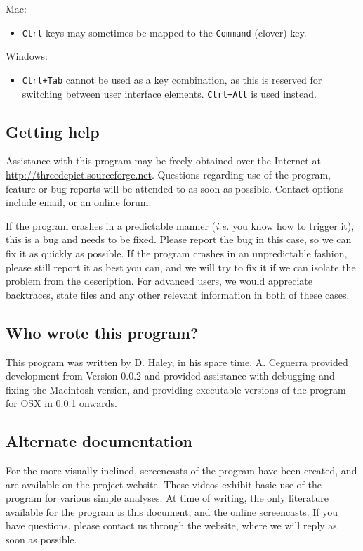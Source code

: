 \documentclass[10pt]{article}
\begin{document}
Mac:
\begin{itemize}
 \item \texttt{Ctrl} keys may sometimes be mapped to the \texttt{Command} (clover) key.
\end{itemize}

Windows:
\begin{itemize}
 \item \texttt{Ctrl+Tab} cannot be used as a key combination, as this is reserved for switching between user interface elements. \texttt{Ctrl+Alt} is used instead.
\end{itemize}

 
\subsection{Getting help}

Assistance with this program may be freely obtained over the Internet at \url{http://threedepict.sourceforge.net}. Questions regarding use of the program, feature or bug reports will be attended to as soon as possible. Contact options include email, or an online forum.

If the program crashes in a predictable manner (\emph{i.e.} you know how to trigger it), this is a bug and needs to be fixed. Please report the bug in this case, so we can fix it as quickly as possible. If the program crashes in an unpredictable fashion, please still report it as best you can, and we will try to fix it if we can isolate the problem from the description. For advanced users, we would appreciate backtraces, state files and any other relevant information in both of these cases.

\subsection{Who wrote this program?}

This program was written by D. Haley, in his spare time. A. Ceguerra provided development from Version 0.0.2 and provided assistance with debugging and fixing the Macintosh version, and providing executable versions of the program for OSX in 0.0.1 onwards. 

\subsection{Alternate documentation}
For the more visually inclined, screencasts of the program have been created, and are available on the project website. These videos exhibit basic use of the program for various simple analyses. At time of writing, the only literature available for the program is this document, and the online screencasts. If you have questions, please contact us through the website, where we will reply as soon as possible. 
\end{document}

